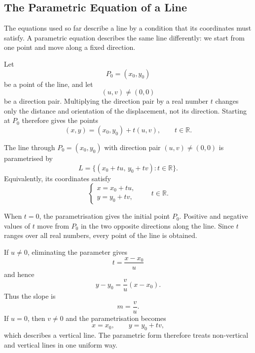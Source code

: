 \subsection{The Parametric Equation of a Line}

The equations used so far describe a line by a condition that its coordinates
must satisfy. A parametric equation describes the same line differently: we
start from one point and move along a fixed direction.

Let
\[
P_0=(x_0,y_0)
\]
be a point of the line, and let
\[
(u,v)\neq(0,0)
\]
be a direction pair. Multiplying the direction pair by a real number $t$
changes only the distance and orientation of the displacement, not its
direction. Starting at $P_0$ therefore gives the points
\[
(x,y)=(x_0,y_0)+t(u,v),
\qquad t\in\mathbb{R}.
\]

\begin{definitionbox}
The line through $P_0=(x_0,y_0)$ with direction pair $(u,v)\neq(0,0)$ is
parametrised by
\[
L=\{(x_0+tu,\,y_0+tv):t\in\mathbb{R}\}.
\]
Equivalently, its coordinates satisfy
\[
\begin{cases}
x=x_0+tu,\\
y=y_0+tv,
\end{cases}
\qquad t\in\mathbb{R}.
\]
\end{definitionbox}

When $t=0$, the parametrisation gives the initial point $P_0$. Positive and
negative values of $t$ move from $P_0$ in the two opposite directions along the
line. Since $t$ ranges over all real numbers, every point of the line is
obtained.

\begin{center}
\end{center}

If $u\neq0$, eliminating the parameter gives
\[
t=\frac{x-x_0}{u}
\]
and hence
\[
y-y_0=\frac{v}{u}(x-x_0).
\]
Thus the slope is
\[
m=\frac{v}{u}.
\]
If $u=0$, then $v\neq0$ and the parametrisation becomes
\[
x=x_0,
\qquad
y=y_0+tv,
\]
which describes a vertical line. The parametric form therefore treats
non-vertical and vertical lines in one uniform way.

